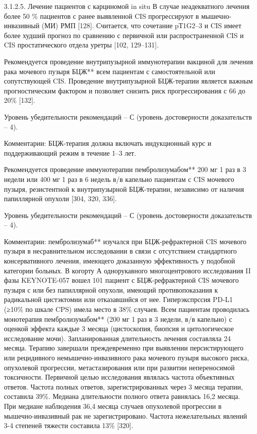 3.1.2.5. Лечение пациентов с карциномой in situ
В случае неадекватного лечения более 50 \% пациентов с ранее выявленной CIS прогрессируют в мышечно-инвазивный (МИ) РМП [128]. Считается, что сочетание pТ1G2–3 и CIS имеет более худший прогноз по сравнению с первичной или распространенной CIS и CIS простатического отдела уретры [102, 129–131]. 

Рекомендуется проведение внутрипузырной иммунотерапии вакциной для лечения рака мочевого пузыря БЦЖ** всем пациентам с самостоятельной или сопутствующей CIS. Проведение внутрипузырной БЦЖ-терапии является важным прогностическим фактором и позволяет снизить риск прогрессирования с 66 до 20\% [132].

Уровень убедительности рекомендаций – С (уровень достоверности доказательств – 4).

Комментарии: БЦЖ-терапия должна включать индукционный курс и поддерживающий режим в течение 1–3 лет.

Рекомендуется проведение иммунотерапии пембролизумабом** 200 мг 1 раз в 3 недели или 400 мг 1 раз в 6 недель в/в капельно пациентам с CIS мочевого пузыря, резистентной к внутрипузырной БЦЖ-терапии, независимо от наличия папиллярной опухоли [304, 320, 336].

Уровень убедительности рекомендаций – С (уровень достоверности доказательств – 4).

Комментарии: пембролизумаб** изучался при БЦЖ-рефрактерной CIS мочевого пузыря в несравнительном исследовании в связи с отсутствием стандартного консервативного лечения, имеющего доказанную эффективность у подобной категории больных. В когорту А однорукавного многоцентрового исследования II фазы KEYNOTE-057 вошел 101 пациент с БЦЖ-рефрактерной CIS мочевого пузыря с или без папиллярной опухоли, имеющий противопоказания к радикальной цистэктомии или отказавшийся от нее. Гиперэкспрссия PD-L1 (≥10\% по шкале CPS) имела место в 38\% случаев. Всем пациентам проводилась монотерапия пембролизумабом** (200 мг 1 раз в 3 недели, в/в капельно) с оценкой эффекта каждые 3 месяца (цистоскопия, биопсия и цитологическое исследование мочи). Запланированная длительность лечения составляла 24 месяца. Терапию завершали преждевременно при выявлении персистирующего или рецидивного немышечно-инвазивного рака мочевого пузыря высокого риска, опухолевой прогрессии, метастазирования или при развитии непереносимой токсичности. Первичной целью исследования являлась частота объективных ответов. Частота полных ответов, зарегистрированных через 3 месяца терапии, составила 39\%. Медиана длительности полного ответа равнялась 16,2 месяца. При медиане наблюдения 36,4 месяца случаев опухолевой прогрессии в мышечно-инвазивный рак не зарегистрировано. Частота нежелательных явлений 3-4 степеней тяжести составила 13\% [320]. 


